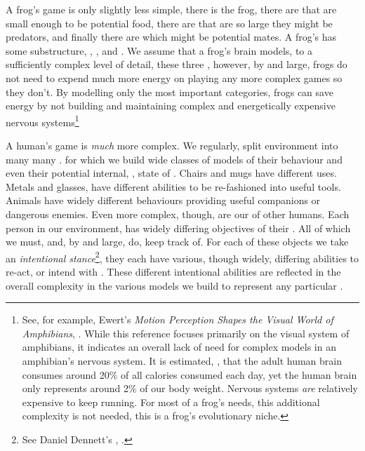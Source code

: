 A frog's game is only slightly less simple, there is the frog, there are 
 that are small enough to be potential food, there are 
 that are so large they might be predators, and finally 
there are  which might be potential mates. A frog's 
 has some substructure, , 
, and . We assume that a frog's brain 
models, to a sufficiently complex level of detail, these three 
, however, by and large, frogs do not need to expend much 
more energy on playing any more complex games so they don't. By modelling 
only the most important categories, frogs can save energy by not building 
and maintaining complex and energetically expensive nervous 
systems\footnote{See, for example, Ewert's \emph{Motion Perception Shapes 
the Visual World of Amphibians}, 
\cite{ewert2004motionPerceptionAmphibians}. While this reference focuses 
primarily on the visual system of amphibians, it indicates an overall lack 
of need for complex models in an amphibian's nervous system. It is 
estimated, \cite{raichleGusnard2002brainEnergyBudget}, that the adult 
human brain consumes around 20\% of all calories consumed each day, yet 
the human brain only represents around 2\% of our body weight. Nervous 
systems \emph{are} relatively expensive to keep running. For most of a 
frog's needs, this additional complexity is not needed, this is a frog's 
evolutionary niche.} 

A human's game is \emph{much} more complex. We regularly, split 
 environment into many many .  for 
which we build wide classes of models of their behaviour and even their 
potential internal, , state of . Chairs and 
mugs have different uses. Metals and glasses, have different abilities to 
be re-fashioned into useful tools. Animals have widely different 
behaviours providing useful companions or dangerous enemies. Even more 
complex, though, are our  of other humans. Each person in 
our environment, has widely differing objectives of their . All 
of which we must, and, by and large, do, keep track of. For each of these 
objects we take an \emph{intentional stance}\footnote{See Daniel Dennett's 
, \cite{dennett1987a}.}, they each have 
various, though widely, differing abilities to re-act, or intend with 
. These different intentional abilities are reflected in the 
overall complexity in the various models we build to represent any 
particular . 

